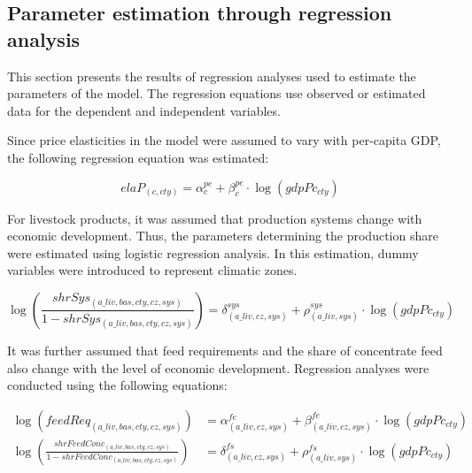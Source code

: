 \subsection{Parameter estimation through regression analysis}

This section presents the results of regression analyses used to estimate the parameters of the model.  
The regression equations use observed or estimated data for the dependent and independent variables.

\bigskip

Since price elasticities in the model were assumed to vary with per-capita GDP, 
the following regression equation was estimated:

\begin{equation}
elaP_{(c,cty)} = \alpha^{pe}_{c} + \beta^{pe}_{c} \cdot \log(gdpPc_{cty})
\label{eq:pe_reg}
\end{equation}

\bigskip

For livestock products, it was assumed that production systems change with economic development.  
Thus, the parameters determining the production share were estimated using logistic regression analysis.  
In this estimation, dummy variables were introduced to represent climatic zones.

\begin{equation}
\log \left(
\frac{
shrSys_{(a\_liv,bas,cty,cz,sys)}
}{
1 - shrSys_{(a\_liv,bas,cty,cz,sys)}
}
\right)
=
\delta^{sys}_{(a\_liv,cz,sys)} + \rho^{sys}_{(a\_liv,sys)} \cdot \log(gdpPc_{cty})
\label{eq:sys_reg}
\end{equation}

\bigskip

It was further assumed that feed requirements and the share of concentrate feed 
also change with the level of economic development.  
Regression analyses were conducted using the following equations:

\begin{align}
\log \left( feedReq_{(a\_liv,bas,cty,cz,sys)} \right)
&=
\alpha^{fe}_{(a\_liv,cz,sys)} + \beta^{fe}_{(a\_liv,cz,sys)} \cdot \log(gdpPc_{cty}) \label{eq:fe_reg}\\[6pt]
\log \left(
\frac{
shrFeedConc_{(a\_liv,bas,cty,cz,sys)}
}{
1 - shrFeedConc_{(a\_liv,bas,cty,cz,sys)}
}
\right)
&=
\delta^{fs}_{(a\_liv,cz,sys)} + \rho^{fs}_{(a\_liv,sys)} \cdot \log(gdpPc_{cty})
\label{eq:fs_reg}
\end{align}

